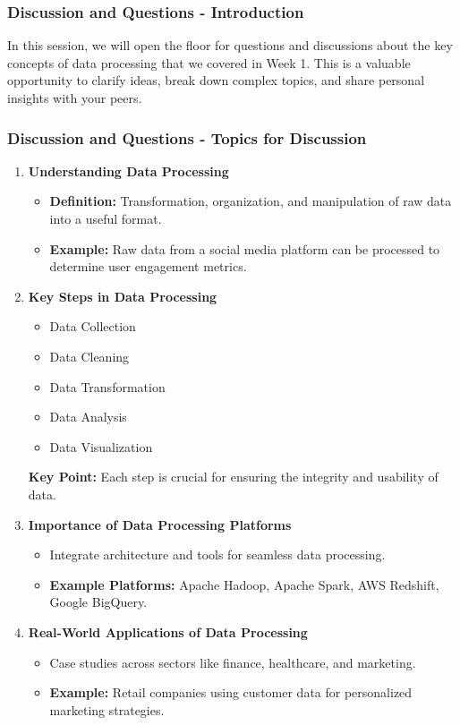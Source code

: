\documentclass[aspectratio=169]{beamer}
\begin{document}
\begin{frame}[fragile]
  \frametitle{Discussion and Questions - Introduction}
  In this session, we will open the floor for questions and discussions about the key concepts of data processing that we covered in Week 1. 
  This is a valuable opportunity to clarify ideas, break down complex topics, and share personal insights with your peers.
\end{frame}

\begin{frame}[fragile]
  \frametitle{Discussion and Questions - Topics for Discussion}
  \begin{enumerate}
    \item \textbf{Understanding Data Processing} 
      \begin{itemize}
        \item \textbf{Definition:} Transformation, organization, and manipulation of raw data into a useful format.
        \item \textbf{Example:} Raw data from a social media platform can be processed to determine user engagement metrics.
      \end{itemize}
    
    \item \textbf{Key Steps in Data Processing}
      \begin{itemize}
        \item Data Collection
        \item Data Cleaning
        \item Data Transformation
        \item Data Analysis
        \item Data Visualization
      \end{itemize}
      \textbf{Key Point:} Each step is crucial for ensuring the integrity and usability of data.
    
    \item \textbf{Importance of Data Processing Platforms}
      \begin{itemize}
        \item Integrate architecture and tools for seamless data processing.
        \item \textbf{Example Platforms:} Apache Hadoop, Apache Spark, AWS Redshift, Google BigQuery.
      \end{itemize}
    
    \item \textbf{Real-World Applications of Data Processing}
      \begin{itemize}
        \item Case studies across sectors like finance, healthcare, and marketing.
        \item \textbf{Example:} Retail companies using customer data for personalized marketing strategies.
      \end{itemize}
  \end{enumerate}
\end{frame}
\end{document}
